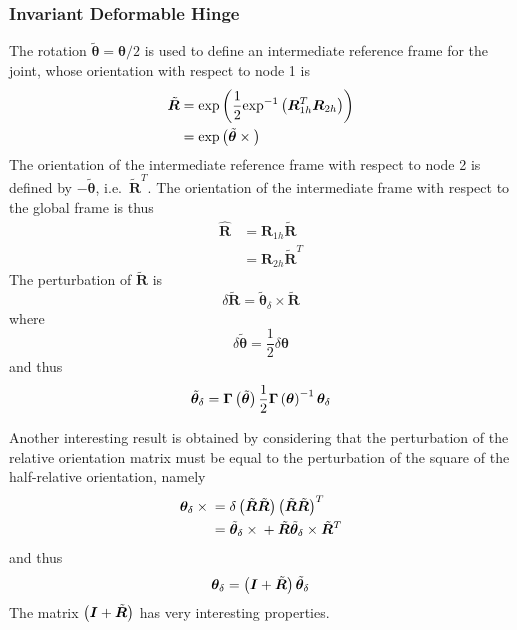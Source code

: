\documentclass[10pt,fleqn,subeqn]{report}
\newcommand{\T}[1]{\bm{#1}}
\begin{document}
\subsubsection{Invariant Deformable Hinge}
\label{sec:deformable-hinge-invariant}
The rotation $\tilde{\T{\theta}}=\T{\theta}/2$
is used to define an intermediate reference frame for the joint,
whose orientation with respect to node 1 is
\begin{align}
	\tilde{\T{R}}
	&= \llk{exp}\plbr{\frac{1}{2}\llk{exp}^{-1}\plbr{\T{R}_{1h}^T \T{R}_{2h}}} \nonumber \\
	&= \llk{exp}\plbr{\tilde{\T{\theta}}\times{}}
\end{align}
The orientation of the intermediate reference frame with respect 
to node 2 is defined by $-\tilde{\T{\theta}}$, i.e.\ $\tilde{\T{R}}^T$.
The orientation of the intermediate frame with respect
to the global frame is thus
\begin{subequations}
\begin{align}
	\hat{\T{R}} &= \T{R}_{1h} \tilde{\T{R}}
		\label{eq:inv-def-h-hatR-1} \\
	&= \T{R}_{2h} \tilde{\T{R}}^T
		\label{eq:inv-def-h-hatR-2}
\end{align}
\end{subequations}
The perturbation of $\tilde{\T{R}}$ is
\begin{equation}
	\delta\tilde{\T{R}} = \tilde{\T{\theta}}_{\delta}\times\tilde{\T{R}}
\end{equation}
where
\begin{equation}
	\delta\tilde{\T{\theta}} = \frac{1}{2} \delta \T{\theta}
\end{equation}
and thus
\begin{equation}
	\tilde{\T{\theta}}_{\delta} = \T{\Gamma}\plbr{\tilde{\T{\theta}}} \frac{1}{2} \T{\Gamma}\plbr{\T{\theta}}^{-1} \T{\theta}_{\delta} 
\end{equation}

Another interesting result is obtained by considering that
the perturbation of the relative orientation matrix
must be equal to the perturbation of the square 
of the half-relative orientation, namely
\begin{align}
	\T{\theta}_{\delta} \times{}
	&= \delta\plbr{\tilde{\T{R}}\tilde{\T{R}}} \plbr{\tilde{\T{R}}\tilde{\T{R}}}^T \nonumber \\
	&= \tilde{\T{\theta}}_{\delta} \times{} + \tilde{\T{R}} \tilde{\T{\theta}}_{\delta} \times \tilde{\T{R}}^T
\end{align}
and thus
\begin{equation}
	\T{\theta}_{\delta} = \plbr{\T{I} + \tilde{\T{R}}} \tilde{\T{\theta}}_{\delta}
	\label{eq:inv-def-h-theta-delta-tilde}
\end{equation}
The matrix $\plbr{\T{I} + \tilde{\T{R}}}$ has very interesting properties.
\end{document}
